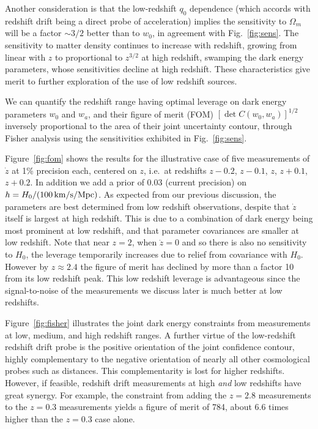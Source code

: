 \documentclass[preprint2, 10pt]{aastex}
\newcommand{\om}{\Omega_m}
\begin{document}
Another consideration is that the low-redshift $q_0$ dependence (which 
accords with redshift drift being a direct probe of acceleration) implies 
the sensitivity to $\om$ will be a factor $\sim3/2$ better than to $w_0$, 
in agreement with Fig.~\ref{fig:sens}. The sensitivity to matter density 
continues to increase with redshift, growing from linear with $z$ to 
proportional to $z^{3/2}$ at high redshift, swamping the dark energy 
parameters, whose sensitivities decline at high redshift. These 
characteristics give merit to further exploration of the use of 
low redshift sources. 

We can quantify the redshift range having optimal leverage on dark energy 
parameters $w_0$ and $w_a$, and their figure of merit (FOM) 
$[\det C(w_0,w_a)]^{1/2}$ inversely proportional to the area of their joint 
uncertainty contour, through Fisher analysis using the sensitivities 
exhibited in Fig.~\ref{fig:sens}. 

Figure~\ref{fig:fom} shows the results for the illustrative case of 
five measurements of $\dot z$ at 1\% precision each, centered on $z$, 
i.e.\ at redshifts $z-0.2$, $z-0.1$, $z$, $z+0.1$, $z+0.2$. In addition 
we add a prior of $0.03$ (current precision) on 
$h=H_0/(100\,{\rm km/s/Mpc})$. As expected from our previous discussion, 
the parameters are best determined from low redshift observations, despite 
that $\dot z$ itself is largest at high redshift. This is due to a 
combination of dark energy being most prominent at low redshift, and 
that parameter covariances are smaller at low redshift. Note that near 
$z=2$, when $\dot z=0$ and so there is also no sensitivity to $H_0$, 
the leverage temporarily increases due to relief from covariance with 
$H_0$. However by $z\approx2.4$ the figure of merit has declined by more 
than a factor 10 from its low redshift peak. This low redshift leverage is 
advantageous since the signal-to-noise of the measurements we discuss later 
is much better at low redshifts. 

Figure~\ref{fig:fisher} illustrates the joint dark energy constraints 
from measurements at low, medium, and high redshift ranges. A further virtue 
of the low-redshift redshift drift probe is the positive orientation of 
the joint confidence contour, highly complementary to the negative orientation 
of nearly all other cosmological probes such as distances. This 
complementarity is lost for higher redshifts. However, if feasible, redshift 
drift measurements at high {\it and\/} low redshifts have great synergy. 
For example, the constraint from adding the $z=2.8$ measurements to the 
$z=0.3$ measurements yields a figure of merit of 784, about 6.6 times 
higher than the $z=0.3$ case alone. 
\end{document}
